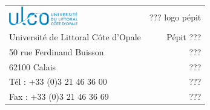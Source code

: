 \begin{titlepage}
\begin{center}
		\begin{footnotesize}
			\begin{tabular}{p{10cm} r}
			\includegraphics[width=3cm]{images/logo_ulco}
				& ??? logo pépit \\
			Université de Littoral Côte d'Opale
				& Pépit ??? \\
			50 rue Ferdinand Buisson 
				& ??? \\
			62100 Calais
				& ??? \\
			Tél : +33 (0)3 21 46 36 00
				& ??? \\
			Fax : +33 (0)3 21 46 36 69
				& ??? \\
			\end{tabular}
		\end{footnotesize}
\end{center}

\end{titlepage}
\newpage
\null
\newpage
